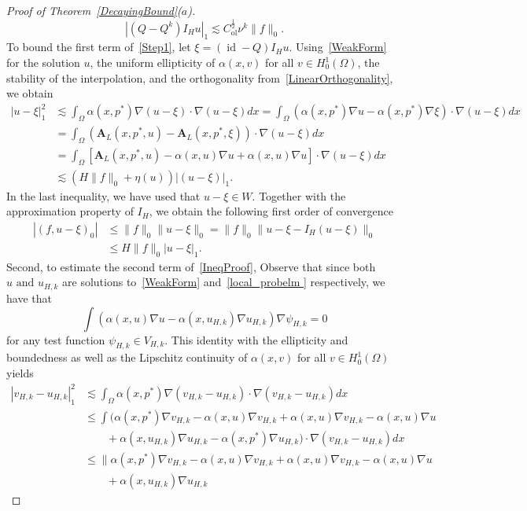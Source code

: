 \documentclass{article}
\begin{document}
\begin{proof}[Proof of Theorem~\ref{DecayingBound}($a$)]
\[|(Q-Q^k)I_Hu|_1\lesssim {C_\mathrm{ol}^\frac{1}{2} \nu^k}\|f\|_0. 
\]
To bound the first term of~\eqref{Step1}, let $\xi=(\operatorname{id}-Q)I_Hu$.  Using~\eqref{WeakForm} for the solution $u$,  the uniform ellipticity of $\alpha(x,v)$ for all $ v \in H^1_0(\Omega)$, the stability of the interpolation, and the orthogonality from~\eqref{LinearOrthogonality}, we obtain 
\begin{align*}
     |u-\xi|_1^2 &\lesssim \int_{\Omega} \alpha(x,p^*)\nabla(u-\xi)\cdot\nabla(u-\xi)dx =\int_{\Omega} (\alpha(x,p^*)\nabla u-\alpha(x,p^*)\nabla \xi)\cdot\nabla(u-\xi)dx  \\
     &= \int_{\Omega} (\mathbf{A}_L(x,p^*,u) -\mathbf{A}_L(x,p^*,\xi ) )\cdot\nabla(u-\xi)dx  \\
    & {=} \int_{\Omega} [\mathbf{A}_L(x,p^*,u)-\alpha(x,u)\nabla u+\alpha(x,u)\nabla u]\cdot\nabla(u-\xi)dx\\
   & \lesssim (H\|f\|_0+\eta(u))|(u-\xi)|_1. 
\end{align*}
In the last inequality, we have used that $u-\xi \in W$. Together with the approximation property of $I_H$, we obtain the following first order of convergence 
\begin{align*}
|(f,u-\xi)_0|&\leq \|f\|_0\|u-\xi \|_0=\|f\|_0\|u-\xi-I_H(u-\xi) \|_0 \\
&\leq H\|f\|_0|u-\xi|_1.
\end{align*}
 Second, to estimate the second term of~\eqref{IneqProof}, Observe that since both $u \text{ and } u_{H,k}$ are solutions to~\eqref{WeakForm} and~\eqref{local_probelm } respectively, we have that \[\int (\alpha(x,u)\nabla u-\alpha(x,u_{H,k})\nabla u_{H,k})\nabla \psi_{H,k}=0 \] for any test function $\psi_{H,k} \in V_{H,k}$.
This identity with the ellipticity and boundedness as well as the Lipschitz continuity of $\alpha(x,v)$ for all $v \in H^1_0(\Omega)$ yields
\begin{align*}
    |v_{H,k} -u_{H,k}|_1^2 &\lesssim \int_{\Omega} \alpha(x,p^*)\nabla(v_{H,k}-u_{H,k})\cdot\nabla(v_{H,k} -u_{H,k})dx \\
    &\leq \int(\alpha(x,p^*)\nabla v_{H,k} -\alpha(x,u)\nabla v_{H,k}+\alpha(x,u)\nabla v_{H,k}-\alpha(x,u)\nabla u\\
    &\qquad+\alpha(x,u_{H,k})\nabla u_{H,k} 
    -\alpha(x,p^*)\nabla u_{H,k}) \cdot\nabla(v_{H,k}-u_{H,k}) dx\\
    &\leq\|\alpha(x,p^*)\nabla v_{H,k} -\alpha(x,u)\nabla v_{H,k}+\alpha(x,u)\nabla v_{H,k}-\alpha(x,u)\nabla u\\
    &\qquad+\alpha(x,u_{H,k})\nabla u_{H,k} 

\end{align*}
\end{proof}
\end{document}

